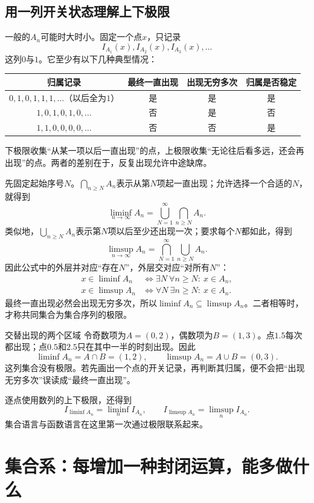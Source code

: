 \subsection{用一列开关状态理解上下极限}

一般的$A_n$可能时大时小。固定一个点$x$，只记录
\[
 I_{A_1}(x),I_{A_2}(x),I_{A_3}(x),\ldots
\]
这列$0$与$1$。它至少有以下几种典型情况：
\begin{center}
\begin{tabular}{c|c|c|c}
归属记录 & 最终一直出现 & 出现无穷多次 & 归属是否稳定\\\hline
$0,1,0,1,1,1,\ldots$（以后全为$1$）& 是 & 是 & 是\\
$1,0,1,0,1,0,\ldots$ & 否 & 是 & 否\\
$1,1,0,0,0,0,\ldots$ & 否 & 否 & 是
\end{tabular}
\end{center}
下极限收集“从某一项以后一直出现”的点，上极限收集“无论往后看多远，还会再出现”的点。两者的差别在于，反复出现允许中途缺席。

先固定起始序号$N$。$\bigcap_{n\geq N}A_n$表示从第$N$项起一直出现；允许选择一个合适的$N$，就得到
\[
 \boxed{\liminf_{n\to\infty}A_n
       =\bigcup_{N=1}^{\infty}\bigcap_{n\geq N}A_n.}
\]
类似地，$\bigcup_{n\geq N}A_n$表示第$N$项以后至少还出现一次；要求每个$N$都如此，得到
\[
 \boxed{\limsup_{n\to\infty}A_n
       =\bigcap_{N=1}^{\infty}\bigcup_{n\geq N}A_n.}
\]
因此公式中的外层并对应“存在$N$”，外层交对应“对所有$N$”：
\[
\begin{aligned}
 x\in\liminf A_n&\iff\exists N\ \forall n\geq N:\ x\in A_n,\\
 x\in\limsup A_n&\iff\forall N\ \exists n\geq N:\ x\in A_n.
\end{aligned}
\]
最终一直出现必然会出现无穷多次，所以$\liminf A_n\subseteq\limsup A_n$。二者相等时，才称共同集合为集合序列的极限。

\begin{bookexample}{交替出现的两个区域}
令奇数项为$A=(0,2)$，偶数项为$B=(1,3)$。点$1.5$每次都出现；点$0.5$和$2.5$只在其中一半的时刻出现。因此
\[
 \liminf A_n=A\cap B=(1,2),\qquad
 \limsup A_n=A\cup B=(0,3).
\]
这列集合没有极限。若先画出一个点的开关记录，再判断其归属，便不会把“出现无穷多次”误读成“最终一直出现”。
\end{bookexample}

逐点使用数列的上下极限，还得到
\[
 I_{\liminf A_n}=\liminf_n I_{A_n},\qquad
 I_{\limsup A_n}=\limsup_n I_{A_n}.
\]
集合语言与函数语言在这里第一次通过极限联系起来。

\section{集合系：每增加一种封闭运算，能多做什么}

